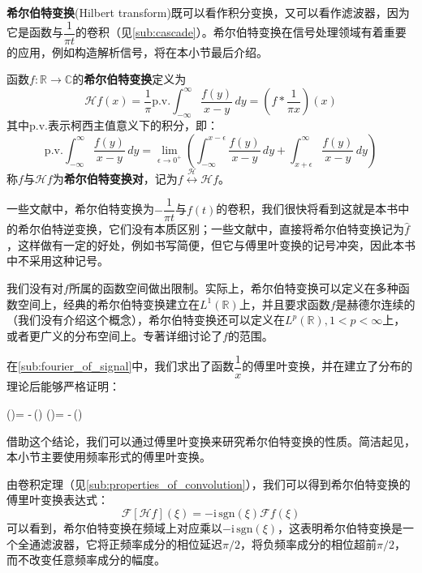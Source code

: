 \textbf{希尔伯特变换}(Hilbert transform)既可以看作积分变换，又可以看作滤波器，因为它是函数与$\dfrac{1}{\pi t}$的卷积（见\ref{sub:cascade}）。希尔伯特变换在信号处理领域有着重要的应用，例如构造解析信号，将在本小节最后介绍。
\begin{definition}[希尔伯特变换]
    函数$f:\mathbb{R}\to\mathbb{C}$的\textbf{希尔伯特变换}定义为
    \[\mathcal{H} f(x)=\frac{1}{\pi}\text{p.v.}\int_{-\infty}^{\infty}\frac{f(y)}{x-y}\,dy=\left(f*\frac{1}{\pi x}\right)(x)\]
    其中p.v.表示柯西主值意义下的积分\cite{hilbert_transform}，即：
    \[\text{p.v.}\int_{-\infty}^{\infty}\frac{f(y)}{x-y}\,dy=\lim_{\epsilon\to 0^+}\left(\int_{-\infty}^{x-\epsilon}\frac{f(y)}{x-y}\,dy+\int_{x+\epsilon}^{\infty}\frac{f(y)}{x-y}\,dy\right)\]
    称$f$与$\mathcal{H} f$为\textbf{希尔伯特变换对}，记为$f\overset{\mathcal{H} }{\longleftrightarrow} \mathcal{H} f$。
\end{definition}
\begin{remark}
    一些文献中\cite{brad_osgood_ee261}，希尔伯特变换为$-\dfrac{1}{\pi t}$与$f(t)$的卷积，我们很快将看到这就是本书中的希尔伯特逆变换，它们没有本质区别；一些文献中\cite{signal_systems}，直接将希尔伯特变换记为$\hat{f}$，这样做有一定的好处，例如书写简便，但它与傅里叶变换的记号冲突，因此本书中不采用这种记号。
\end{remark}
\begin{remark}
    我们没有对$f$所属的函数空间做出限制。实际上，希尔伯特变换可以定义在多种函数空间上，经典的希尔伯特变换建立在$L^1(\mathbb{R})$上，并且要求函数$f$是赫德尔连续的（我们没有介绍这个概念），希尔伯特变换还可以定义在$L^p(\mathbb{R}),1<p<\infty$上，或者更广义的分布空间上。专著\cite{hilbert_transform}详细讨论了$f$的范围。
\end{remark}

在\ref{sub:fourier_of_signal}中，我们求出了函数$\dfrac{1}{x}$的傅里叶变换，并在建立了分布的理论后能够严格证明：
\begin{lralign}
     (\xi)= -\,(\xi)
    \switch
     (\omega)= -\,(\omega)
\end{lralign}

借助这个结论，我们可以通过傅里叶变换来研究希尔伯特变换的性质。简洁起见，本小节主要使用频率形式的傅里叶变换。

由卷积定理（见\ref{sub:properties_of_convolution}），我们可以得到希尔伯特变换的傅里叶变换表达式：
    \[\mathcal{F} [\mathcal{H} f](\xi)=-\mathrm{i}\,\text{sgn}(\xi)\mathcal{F} f(\xi)\]
可以看到，希尔伯特变换在频域上对应乘以$-\mathrm{i}\,\text{sgn}(\xi)$，这表明希尔伯特变换是一个全通滤波器，它将正频率成分的相位延迟$\pi/2$，将负频率成分的相位超前$\pi/2$，而不改变任意频率成分的幅度。

